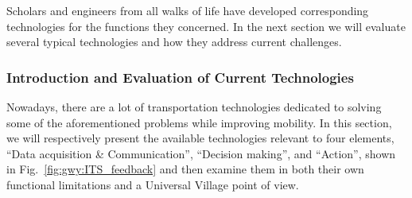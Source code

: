 \documentclass[letterpaper, twocolumn, 10pt, conference]{IEEEtran}
\begin{document}
Scholars and engineers from all walks of life have developed corresponding technologies for the functions they concerned. In the next section we will evaluate several typical technologies and how they address current challenges.


\subsubsection{Introduction and Evaluation of Current Technologies}
\label{sssec:gwy:ITS:evaluation}

Nowadays, there are a lot of transportation technologies dedicated to solving some of the aforementioned problems while improving mobility. In this section, we will respectively present the available technologies relevant to four elements, \enquote{Data acquisition \& Communication}, \enquote{Decision making}, and  \enquote{Action},  shown in Fig.~\ref{fig:gwy:ITS_feedback} and then examine them in both their own functional limitations and a Universal Village point of view. 
\end{document}
